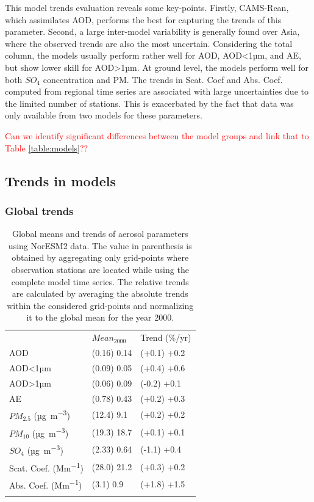 \documentclass[journal abbreviation, manuscript]{copernicus}
\begin{document}
This model trends evaluation reveals some key-points. Firstly, CAMS-Rean, which assimilates AOD, performs the best for capturing the trends of this parameter. Second, a large inter-model variability is generally found over Asia, where the observed trends are also the most uncertain.
Considering the total column, the models usually perform rather well for AOD, AOD<1µm, and AE, but show lower skill for AOD>1µm. At ground level, the models perform well for both $SO_{4}$ concentration and PM. The trends in Scat. Coef and Abs. Coef. computed from regional time series are associated with large uncertainties due to the limited number of stations. This is exacerbated by the fact that data was only available from two models for these parameters.

\textcolor{red}{Can we identify significant differences between the model groups and link that to Table \ref{table:models}??}

\subsection{Trends in models}\label{global_trends}

\subsubsection{Global trends}

\begin{table}
 \begin{tabular}{lll}
  \tophline
                                & $Mean_{2000}$ & Trend (\%/yr) \\
  \middlehline
  AOD                           & (0.16) 0.14   & (+0.1) +0.2   \\
  AOD<1µm                       & (0.09) 0.05   & (+0.4) +0.6   \\
  AOD>1µm                       & (0.06) 0.09   & (-0.2) +0.1   \\
  AE                            & (0.78) 0.43   & (+0.2) +0.3   \\
  $PM_{2.5}$ (\unit{µg.m^{-3}}) & (12.4) 9.1    & (+0.2) +0.2   \\
  $PM_{10}$ (\unit{µg.m^{-3}})  & (19.3) 18.7   & (+0.1) +0.1   \\
  $SO_{4}$ (\unit{µg.m^{-3}})   & (2.33) 0.64   & (-1.1) +0.4   \\
  Scat. Coef. (\unit{Mm^{-1}})  & (28.0) 21.2   & (+0.3) +0.2   \\
  Abs. Coef. (\unit{Mm^{-1}})   & (3.1) 0.9     & (+1.8) +1.5   \\
  \bottomhline
 \end{tabular}
 \caption{Global means and trends of aerosol parameters using NorESM2 data. The value in parenthesis is obtained by aggregating only grid-points where observation stations are located while using the complete model time series. The relative trends are calculated by averaging the absolute trends within the considered grid-points and normalizing it to the global mean for the year 2000.}
 \label{table:global_trends}
\end{table}
\end{document}
